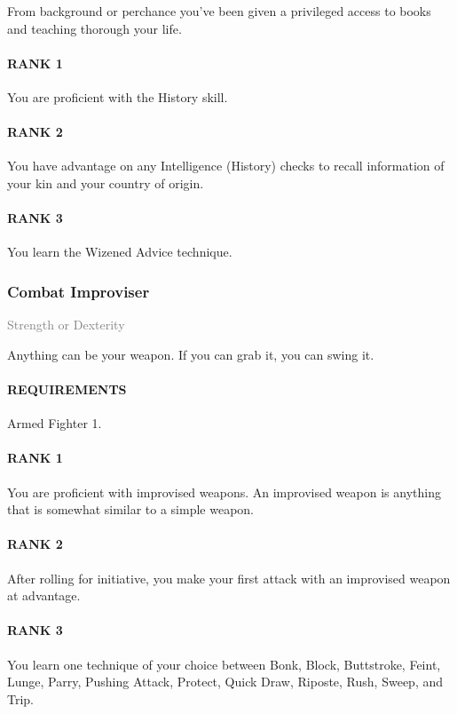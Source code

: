 \normalsize
From background or perchance you've been given a privileged access to books and teaching thorough your life.
\paragraph{RANK 1} You are proficient with the History skill.
\paragraph{RANK 2} You have advantage on any Intelligence (History) checks to recall information of your kin and your country of origin.
\paragraph{RANK 3} You learn the Wizened Advice technique.

\subsubsection{Combat Improviser} \label{tal::combatimproviser}
\small{\textcolor{gray}{Strength or Dexterity}}

\normalsize
Anything can be your weapon.
If you can grab it, you can swing it.
\paragraph{REQUIREMENTS} Armed Fighter 1.
\paragraph{RANK 1} You are proficient with improvised weapons.
An improvised weapon is anything that is somewhat similar to a simple weapon.
\paragraph{RANK 2} After rolling for initiative, you make your first attack with an improvised weapon at advantage.
\paragraph{RANK 3} You learn one technique of your choice between Bonk, Block, Buttstroke, Feint, Lunge, Parry, Pushing Attack, Protect, Quick Draw, Riposte, Rush, Sweep, and Trip.

